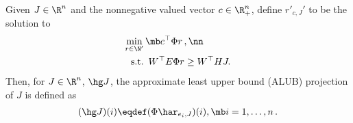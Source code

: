 \begin{definition}\label{alubpop}
Given $J\in \R^n$ and the nonnegative valued vector $c\in \R^n_+$, define $r'_{c,J}'$ to be the solution to 
\begin{align}\label{alubplp}
 \underset{r\in \N'}{\min}& \,\mb c^\top \Phi r\,,\nn\\
 \text{s.t.}& \,\,\, W^\top E \Phi r\geq W^\top HJ.
\end{align}
Then, for $J\in \R^n$, $\hg J$, the approximate least upper bound (ALUB) projection of $J$ is defined as 
\begin{align}\label{tgamdef}
(\hg J)(i)\eqdef(\Phi \har_{e_i,J})(i), \mb i=1,\ldots,n\,.
\end{align}
\end{definition}
\begin{comment}
\begin{remark}\label{lubremark}
The following hold: 
\begin{enumerate}
\item Thanks to \cref{ass:n} \eqref{ass:n1} and \eqref{ass:n2}, 
for arbitrary $J$ and arbitrary \emph{nonnegative valued} $c$,
 $\Phi r_{c,J}$ is uniquely defined.
Indeed, although $r_{c,J}$ might not be unique, but $\Phi r$ where $r$ belongs to the feasible
 region underlying \eqref{lubplp}, is bounded from below, hence  $\Phi r_{c,J}$ is uniquely defined.
It also follows that $\Gamma$ is well-defined.
\item Assuming that $\N$ is polyhedral, 
	the definition of LUB operator $\Gamma \colon \R^n \ra \R^n$ involves $n$ associated linear programs.
\item It holds that $\Gamma J\geq TJ$ (this follows from the fact that if $a\geq c$ and $b\geq c$, then $\min(a,b)\geq c$, where $a, b, c \in \R$).
\item Given $J\in \R^n$, define 
\begin{align*}
\F_J\eqdef\{\,\Phi r\,:\,\Phi r\geq TJ, r\in \N\,\}\,.
\end{align*}
Thus $\F_J$ contains vectors in the span of $\Phi$ that upper bound $TJ$. 
Further, since $(\Gamma J)(i) = \min\{ V(i) \,:\, V\in \F_J \}$, it also follows that $\Gamma J \le V$ holds for any $V\in \F_J$.
\item Even though $\Gamma J$ does not belong to the span of $\Phi$, $\Gamma J$ collates the various best upper bounds that can be obtained via the linear program in \eqref{lubplp}.
\item The LUB operator $\Gamma$ in \eqref{gamdef} bears close similarity to the ALP in \eqref{alp}.
In fact, it is not hard to observe that $(\Gamma J)(i) = (\Phi r_{e_i})(i)$ for any $1\le i \le n$; the reason $\Gamma$ is defined the way it is so that this resembles to \eqref{alp} will be clear. 
\end{enumerate}
\end{remark}
\end{comment}
